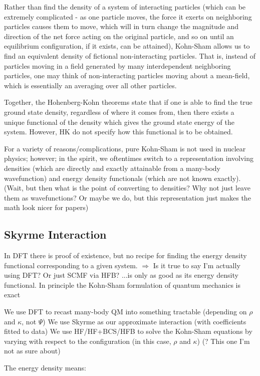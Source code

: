 Rather than find the density of a system of interacting particles (which can be extremely complicated - as one particle moves, the force it exerts on neighboring particles causes them to move, which will in turn change the magnitude and direction of the net force acting on the original particle, and so on until an equilibrium configuration, if it exists, can be attained), Kohn-Sham allows us to find an equivalent density of fictional non-interacting particles. That is, instead of particles moving in a field generated by many interdependent neighboring particles, one may think of non-interacting particles moving about a mean-field, which is essentially an averaging over all other particles.

Together, the Hohenberg-Kohn theorems state that if one is able to find the true ground state density, regardless of where it comes from, then there exists a unique functional of the density which gives the ground state energy of the system. However, HK do not specify how this functional is to be obtained.

For a variety of reasons/complications, pure Kohn-Sham is not used in nuclear physics; however; in the spirit, we oftentimes switch to a representation involving densities (which are directly and exactly attainable from a many-body wavefunction) and energy density functionals (which are not known exactly). (Wait, but then what is the point of converting to densities? Why not just leave them as wavefunctions? Or maybe we do, but this representation just makes the math look nicer for papers)

\subsection{Skyrme Interaction}
In DFT there is proof of existence, but no recipe for finding the energy density functional corresponding to a given system. $\Rightarrow$ Is it true to say I'm actually using DFT? Or just SCMF via HFB? ...is only as good as its energy density functional. In principle the Kohn-Sham formulation of quantum mechanics is exact

We use DFT to recast many-body QM into something tractable (depending on $\rho$ and $\kappa$, not $\Psi$)
We use Skyrme as our approximate interaction (with coefficients fitted to data)
We use HF/HF+BCS/HFB to solve the Kohn-Sham equations by varying with respect to the configuration (in this case, $\rho$ and $\kappa$) (? This one I'm not as sure about)

The energy density means:

